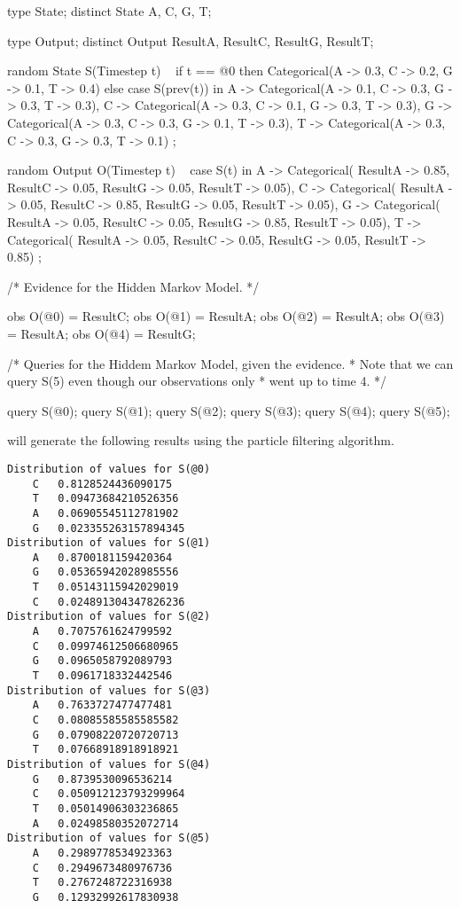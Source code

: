 \documentclass[12pt]{article}
\begin{document}
\begin{blogcode}
type State;
distinct State A, C, G, T;

type Output;
distinct Output ResultA, ResultC, ResultG, ResultT;

random State S(Timestep t) ~
  if t == @0 then 
    Categorical({A -> 0.3, C -> 0.2, G -> 0.1, T -> 0.4})
  else case S(prev(t)) in {
    A -> Categorical({A -> 0.1, C -> 0.3, G -> 0.3, T -> 0.3}),
    C -> Categorical({A -> 0.3, C -> 0.1, G -> 0.3, T -> 0.3}),
    G -> Categorical({A -> 0.3, C -> 0.3, G -> 0.1, T -> 0.3}),
    T -> Categorical({A -> 0.3, C -> 0.3, G -> 0.3, T -> 0.1})
  };

random Output O(Timestep t) ~ 
  case S(t) in {
    A -> Categorical({
      ResultA -> 0.85, ResultC -> 0.05, 
      ResultG -> 0.05, ResultT -> 0.05}),
    C -> Categorical({
      ResultA -> 0.05, ResultC -> 0.85, 
      ResultG -> 0.05, ResultT -> 0.05}),
    G -> Categorical({
      ResultA -> 0.05, ResultC -> 0.05, 
      ResultG -> 0.85, ResultT -> 0.05}),
    T -> Categorical({
      ResultA -> 0.05, ResultC -> 0.05, 
      ResultG -> 0.05, ResultT -> 0.85})
  };

/* Evidence for the Hidden Markov Model.
 */

obs O(@0) = ResultC;
obs O(@1) = ResultA;
obs O(@2) = ResultA;
obs O(@3) = ResultA;
obs O(@4) = ResultG;

/* Queries for the Hiddem Markov Model, given the evidence.  
 * Note that we can query S(5) even though our observations only 
 * went up to time 4.
 */

query S(@0);
query S(@1);
query S(@2);
query S(@3);
query S(@4);
query S(@5);
\end{blogcode}

\bl will generate the following results using the particle filtering algorithm. 
\begin{verbatim}
Distribution of values for S(@0)
	C	0.8128524436090175
	T	0.09473684210526356
	A	0.06905545112781902
	G	0.023355263157894345
Distribution of values for S(@1)
	A	0.8700181159420364
	G	0.05365942028985556
	T	0.05143115942029019
	C	0.024891304347826236
Distribution of values for S(@2)
	A	0.7075761624799592
	C	0.09974612506680965
	G	0.0965058792089793
	T	0.0961718332442546
Distribution of values for S(@3)
	A	0.7633727477477481
	C	0.08085585585585582
	G	0.07908220720720713
	T	0.07668918918918921
Distribution of values for S(@4)
	G	0.8739530096536214
	C	0.050912123793299964
	T	0.05014906303236865
	A	0.02498580352072714
Distribution of values for S(@5)
	A	0.2989778534923363
	C	0.2949673480976736
	T	0.2767248722316938
	G	0.12932992617830938
\end{verbatim}
\end{document}

